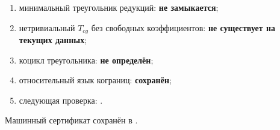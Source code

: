 \begin{protocol}
\begin{enumerate}
 \item минимальный треугольник редукций: \textbf{не замыкается};
 \item нетривиальный \(T_{cg}\) без свободных коэффициентов:
 \textbf{не существует на текущих данных};
 \item коцикл треугольника: \textbf{не определён};
 \item относительный язык кограниц: \textbf{сохранён};
 \item следующая проверка: .
\end{enumerate}
\end{protocol}

Машинный сертификат сохранён в
.
